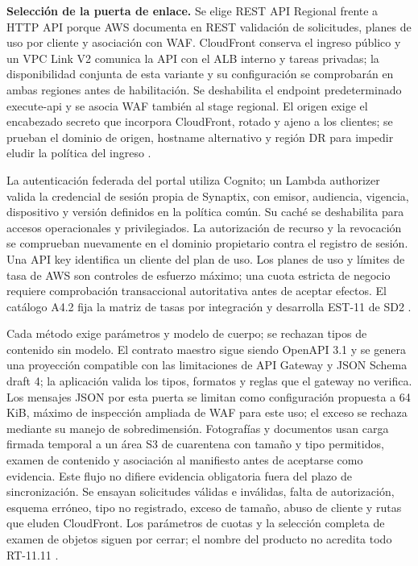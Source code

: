 \textbf{Selección de la puerta de enlace.} Se elige REST API Regional frente a HTTP API porque AWS documenta en REST validación de solicitudes, planes de uso por cliente y asociación con WAF. CloudFront conserva el ingreso público y un VPC Link V2 comunica la API con el ALB interno y tareas privadas; la disponibilidad conjunta de esta variante y su configuración se comprobarán en ambas regiones antes de habilitación. Se deshabilita el endpoint predeterminado execute-api y se asocia WAF también al stage regional. El origen exige el encabezado secreto que incorpora CloudFront, rotado y ajeno a los clientes; se prueban el dominio de origen, hostname alternativo y región DR para impedir eludir la política del ingreso \parencites{p3-api-tipos,p3-api-privada}.

La autenticación federada del portal utiliza Cognito; un Lambda authorizer valida la credencial de sesión propia de Synaptix, con emisor, audiencia, vigencia, dispositivo y versión definidos en la política común. Su caché se deshabilita para accesos operacionales y privilegiados. La autorización de recurso y la revocación se comprueban nuevamente en el dominio propietario contra el registro de sesión. Una API key identifica un cliente del plan de uso. Los planes de uso y límites de tasa de AWS son controles de esfuerzo máximo; una cuota estricta de negocio requiere comprobación transaccional autoritativa antes de aceptar efectos. El catálogo A4.2 fija la matriz de tasas por integración y desarrolla EST-11 de SD2 \parencite{p3-api-cuotas}.

Cada método exige parámetros y modelo de cuerpo; se rechazan tipos de contenido sin modelo. El contrato maestro sigue siendo OpenAPI 3.1 y se genera una proyección compatible con las limitaciones de API Gateway y JSON Schema draft 4; la aplicación valida los tipos, formatos y reglas que el gateway no verifica. Los mensajes JSON por esta puerta se limitan como configuración propuesta a 64 KiB, máximo de inspección ampliada de WAF para este uso; el exceso se rechaza mediante su manejo de sobredimensión. Fotografías y documentos usan carga firmada temporal a un área S3 de cuarentena con tamaño y tipo permitidos, examen de contenido y asociación al manifiesto antes de aceptarse como evidencia. Este flujo no difiere evidencia obligatoria fuera del plazo de sincronización. Se ensayan solicitudes válidas e inválidas, falta de autorización, esquema erróneo, tipo no registrado, exceso de tamaño, abuso de cliente y rutas que eluden CloudFront. Los parámetros de cuotas y la selección completa de examen de objetos siguen por cerrar; el nombre del producto no acredita todo RT-11.11 \parencites{p3-api-validacion,p3-api-limites,p3-waf-cuerpos}[RT-11.11, p.~23]{pucv-transversal}.

